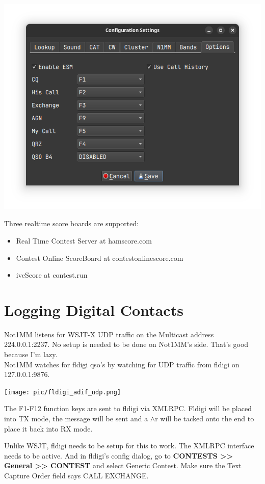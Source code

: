 \documentclass{article}
\begin{document}
\vspace{0.5cm}
\includegraphics[width=0.9\linewidth]{pic/configuration_options.png}
\vspace{0.5cm}

Three realtime score boards are supported:
\begin{itemize}
\item Real Time Contest Server at hamscore.com
\item Contest Online ScoreBoard at contestonlinescore.com
\item iveScore at contest.run
\end{itemize}

\newpage
\section{Logging Digital Contacts}
Not1MM listens for WSJT-X UDP traffic on the Multicast address 224.0.0.1:2237. No setup is needed to be done on Not1MM's side. That's good because I'm lazy.\\Not1MM watches for fldigi qso's by watching for UDP traffic from fldigi on 127.0.0.1:9876.

\vspace{0.5cm}
\texttt{[image: pic/fldigi\_adif\_udp.png]}
\vspace{0.5cm}

The F1-F12 function keys are sent to fldigi via XMLRPC. Fldigi will be placed into TX mode, the message will be sent and a $\wedge$r will be tacked onto the end to place it back into RX mode.

Unlike WSJT, fldigi needs to be setup for this to work. The XMLRPC interface needs to be active. And in fldigi's config dialog, go to \textbf{CONTESTS >> General >> CONTEST} and select Generic Contest. Make sure the Text Capture Order field says CALL EXCHANGE.
\newpage
\end{document}
